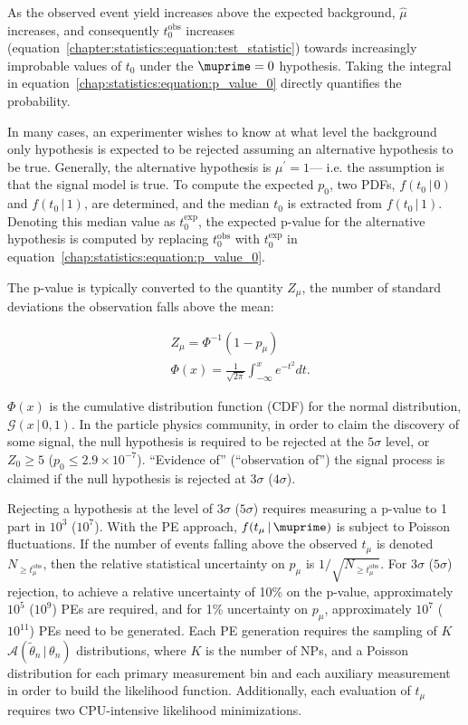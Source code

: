 \noindent
As the observed event yield increases above the expected background,
$\hat{\mu}$ increases, and consequently $t_0^{\textrm{obs}}$ increases
(equation~\ref{chapter:statistics:equation:test_statistic}) towards
increasingly improbable values of $t_{0}$ under the $\muprime = 0$
hypothesis. Taking the integral in
equation~\ref{chap:statistics:equation:p_value_0} directly quantifies
the probability. 

In many cases, an experimenter wishes to know at what level the
background only hypothesis is expected to be rejected assuming an alternative
hypothesis to be true. Generally, the alternative hypothesis is
$\mu^{\prime} = 1$--- i.e. the assumption is that the signal model is
true. To compute the expected $p_0$, two PDFs, $f(t_{0}\,|\,0)$ and
$f(t_{0}\,|\,1)$, are determined, and the median $t_0$ is extracted
from $f(t_{0}\,|\,1)$. Denoting this median value as
$t_0^{\textrm{exp}}$, the expected p-value for the alternative
hypothesis is computed by replacing
$t_{0}^{\textrm{obs}}$ with $t_0^{\textrm{exp}}$ in
equation~\ref{chap:statistics:equation:p_value_0}.

The p-value is typically converted to the quantity $Z_{\mu}$, the number of
standard deviations the observation falls above the mean:

\begin{equation}
\begin{aligned}
& Z_{\mu} = \Phi^{-1}\left(1-p_{\mu}\right) \\
& \Phi(x) = \frac{1}{\sqrt{2\pi}} \int_{-\infty}^x e^{-t^2} dt.
\label{chapter:statistics:equation:z_value}
\end{aligned}
\end{equation}

\noindent
$\Phi(x)$ is the cumulative distribution function (CDF) for the normal
distribution, $\mathcal{G}(x\,|\,0,1)$. In the particle
physics community, in order to claim the discovery of some signal, the
null hypothesis is required to be rejected at the $5\sigma$ level, or
$Z_0 \geq 5$ ($p_0 \leq 2.9 \times 10^{-7}$). ``Evidence of''
(``observation of'') the signal process is claimed if the null
hypothesis is rejected at $3\sigma$ ($4\sigma$). 

Rejecting a hypothesis at the level of $3\sigma$
($5\sigma$) requires measuring a p-value to 1 part in $10^3$
($10^7$). With the PE approach, $f(t_{\mu}\,|\,\muprime)$ is subject
to Poisson fluctuations. 
If the number of events falling above the observed $t_{\mu}$ is
denoted $N_{\geq t_{\mu}^{\textrm{obs}}}$, then the relative
statistical uncertainty on $p_{\mu}$ is $1/\sqrt{N_{\geq
t_{\mu}^{\textrm{obs}}}}$. For $3\sigma$ ($5\sigma$) rejection, to
achieve a relative uncertainty of 10\% on the p-value, approximately
$10^5$ ($10^9$) PEs are required, and for 1\% uncertainty on $p_{\mu}$,
approximately $10^7$ ($10^{11}$) PEs need to be generated. Each PE
generation requires the sampling of $K$
$\mathscr{A}(\tilde{\theta}_n\,|\,\theta_n)$ distributions, where $K$
is the number of NPs, and a Poisson distribution for each primary
measurement bin and each auxiliary measurement in order to build the likelihood
function. Additionally, each evaluation of $t_{\mu}$ requires two CPU-intensive
likelihood minimizations.

